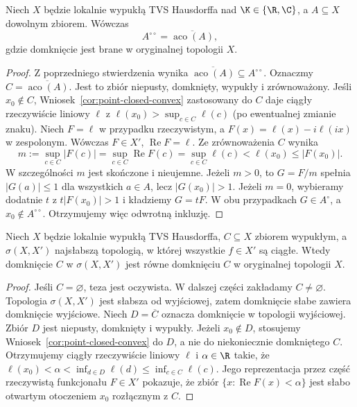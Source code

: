 \begin{twierdzenie}\label{thm:bipolar}
Niech $X$ będzie lokalnie wypukłą TVS Hausdorffa nad
$\K\in\{\R,\C\}$, a $A\subseteq X$ dowolnym zbiorem.
Wówczas
\[
 A^{\circ\circ}=\overline{\operatorname{aco}(A)},
\]
gdzie domknięcie jest brane w oryginalnej topologii $X$.
\end{twierdzenie}
\begin{proof}
Z poprzedniego stwierdzenia wynika
$\overline{\operatorname{aco}(A)}\subseteq A^{\circ\circ}$.
Oznaczmy $C=\overline{\operatorname{aco}(A)}$.
Jest to zbiór niepusty, domknięty, wypukły i zrównoważony.
Jeśli $x_0\notin C$, Wniosek~\ref{cor:point-closed-convex}
zastosowany do $C$ daje ciągły rzeczywiście liniowy
$\ell$ z $\ell(x_0)>\sup_{c\in C}\ell(c)$
(po ewentualnej zmianie znaku).
Niech $F=\ell$ w przypadku rzeczywistym, a
$F(x)=\ell(x)-i\ell(ix)$ w zespolonym.
Wówczas $F\in X'$, $\operatorname{Re}F=\ell$.
Ze zrównoważenia $C$ wynika
\[
 m:=\sup_{c\in C}|F(c)|=\sup_{c\in C}\operatorname{Re}F(c)
 =\sup_{c\in C}\ell(c)<\ell(x_0)\le|F(x_0)|.
\]
W szczególności $m$ jest skończone i nieujemne.
Jeżeli $m>0$, to $G=F/m$ spełnia $|G(a)|\le1$
dla wszystkich $a\in A$, lecz $|G(x_0)|>1$.
Jeżeli $m=0$, wybieramy dodatnie $t$ z
$t|F(x_0)|>1$ i kładziemy $G=tF$.
W obu przypadkach $G\in A^\circ$, a $x_0\notin A^{\circ\circ}$.
Otrzymujemy więc odwrotną inkluzję.
\end{proof}

\begin{wniosek}
\label{cor:weak-convex-closure}
Niech $X$ będzie lokalnie wypukłą TVS Hausdorffa,
$C\subseteq X$ zbiorem wypukłym, a $\sigma(X,X')$
najsłabszą topologią, w której wszystkie $f\in X'$
są ciągłe. Wtedy domknięcie $C$ w $\sigma(X,X')$
jest równe domknięciu $C$ w oryginalnej topologii $X$.
\end{wniosek}
\begin{proof}
Jeśli $C=\varnothing$, teza jest oczywista. W dalszej części
zakładamy $C\ne\varnothing$. Topologia $\sigma(X,X')$ jest słabsza od wyjściowej,
zatem domknięcie słabe zawiera domknięcie wyjściowe.
Niech $D=\overline C$ oznacza domknięcie w topologii
wyjściowej. Zbiór $D$ jest niepusty, domknięty i wypukły.
Jeżeli $x_0\notin D$, stosujemy
Wniosek~\ref{cor:point-closed-convex} do $D$, a nie do
niekoniecznie domkniętego $C$. Otrzymujemy ciągły
rzeczywiście liniowy $\ell$ i $\alpha\in\R$ takie, że
$\ell(x_0)<\alpha<\inf_{d\in D}\ell(d)
\le\inf_{c\in C}\ell(c)$.
Jego reprezentacja przez część rzeczywistą funkcjonału
$F\in X'$ pokazuje, że zbiór
$\{x:\operatorname{Re}F(x)<\alpha\}$ jest słabo otwartym
otoczeniem $x_0$ rozłącznym z $C$.
\end{proof}

